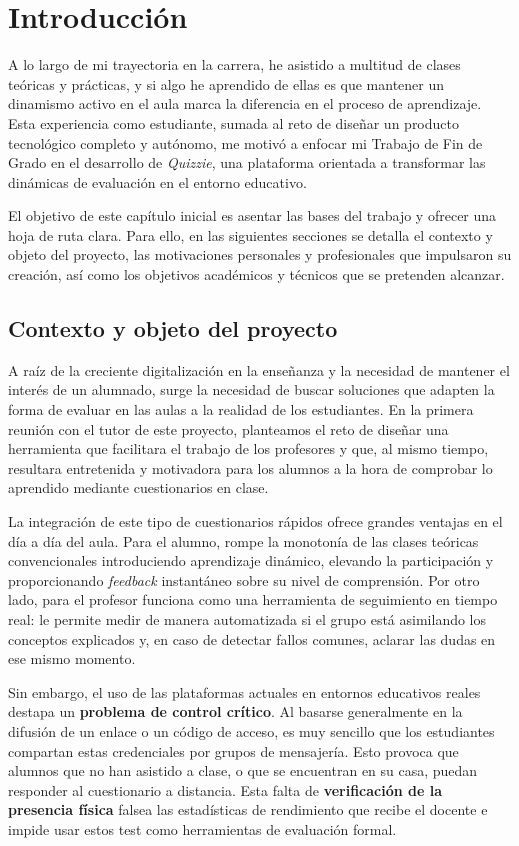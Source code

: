 \chapter{Introducción}\label{cap:introduccion}

A lo largo de mi trayectoria en la carrera, he asistido a multitud de clases teóricas y prácticas, y si algo he aprendido de ellas es que mantener un dinamismo activo en el aula marca la diferencia en el proceso de aprendizaje. Esta experiencia como estudiante, sumada al reto de diseñar un producto tecnológico completo y autónomo, me motivó a enfocar mi Trabajo de Fin de Grado en el desarrollo de \textit{Quizzie}, una plataforma orientada a transformar las dinámicas de evaluación en el entorno educativo. 

El objetivo de este capítulo inicial es asentar las bases del trabajo y ofrecer una hoja de ruta clara. Para ello, en las siguientes secciones se detalla el contexto y objeto del proyecto, las motivaciones personales y profesionales que impulsaron su creación, así como los objetivos académicos y técnicos que se pretenden alcanzar. 

\section{Contexto y objeto del proyecto}\label{sec:contexto_y_objeto_del_proyecto}
A raíz de la creciente digitalización en la enseñanza y la necesidad de mantener el interés de un alumnado, surge la necesidad de buscar soluciones que adapten la forma de evaluar en las aulas a la realidad de los estudiantes. En la primera reunión con el tutor de este proyecto, planteamos el reto de diseñar una herramienta que facilitara el trabajo de los profesores y que, al mismo tiempo, resultara entretenida y motivadora para los alumnos a la hora de comprobar lo aprendido mediante cuestionarios en clase.

La integración de este tipo de cuestionarios rápidos ofrece grandes ventajas en el día a día del aula. Para el alumno, rompe la monotonía de las clases teóricas convencionales introduciendo aprendizaje dinámico, elevando la participación y proporcionando \textit{feedback} instantáneo sobre su nivel de comprensión. Por otro lado, para el profesor funciona como una herramienta de seguimiento en tiempo real: le permite medir de manera automatizada si el grupo está asimilando los conceptos explicados y, en caso de detectar fallos comunes, aclarar las dudas en ese mismo momento.

Sin embargo, el uso de las plataformas actuales en entornos educativos reales destapa un \textbf{problema de control crítico}. Al basarse generalmente en la difusión de un enlace o un código de acceso, es muy sencillo que los estudiantes compartan estas credenciales por grupos de mensajería. Esto provoca que alumnos que no han asistido a clase, o que se encuentran en su casa, puedan responder al cuestionario a distancia. Esta falta de \textbf{verificación de la presencia física} falsea las estadísticas de rendimiento que recibe el docente e impide usar estos test como herramientas de evaluación formal.

